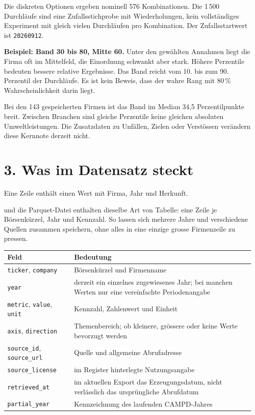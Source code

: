 \documentclass[11pt,a4paper]{article}
\newcommand{\pf}[1]{\path{#1}}
\newcommand{\lead}[1]{{\large\sffamily\color{accent}#1}\par}
\newcommand{\page}[2]{\clearpage\section*{#1}\lead{#2}}
\begin{document}
Die diskreten Optionen ergeben nominell 576 Kombinationen. Die 1\,500 Durchläufe sind eine Zufallsstichprobe mit Wiederholungen, kein vollständiges Experiment mit gleich vielen Durchläufen pro Kombination. Der Zufallsstartwert ist \texttt{20260912}.

\textbf{Beispiel: Band 30 bis 80, Mitte 60.} Unter den gewählten Annahmen liegt die Firma oft im Mittelfeld, die Einordnung schwankt aber stark. Höhere Perzentile bedeuten bessere relative Ergebnisse. Das Band reicht vom 10. bis zum 90. Perzentil der Durchläufe. Es ist kein Beweis, dass der wahre Rang mit 80\,\% Wahrscheinlichkeit darin liegt.

Bei den 143 gespeicherten Firmen ist das Band im Median 34,5 Perzentilpunkte breit. Zwischen Branchen sind gleiche Perzentile keine gleichen absoluten Umweltleistungen. Die Zusatzdaten zu Unfällen, Zielen oder Verstössen verändern diese Kernnote derzeit nicht.

\page{3. Was im Datensatz steckt}{Eine Zeile enthält einen Wert mit Firma, Jahr und Herkunft.}
\pf{data/out/dataset_long.csv} und die Parquet-Datei enthalten dieselbe Art von Tabelle: eine Zeile je Börsenkürzel, Jahr und Kennzahl. So lassen sich mehrere Jahre und verschiedene Quellen zusammen speichern, ohne alles in eine einzige grosse Firmenzeile zu pressen.

\begin{tabularx}{\linewidth}{@{}p{47mm}Y@{}}\toprule
Feld & Bedeutung\\\midrule
\texttt{ticker}, \texttt{company} & Börsenkürzel und Firmenname\\
\texttt{year} & derzeit ein einzelnes zugewiesenes Jahr; bei manchen Werten nur eine vereinfachte Periodenangabe\\
\texttt{metric}, \texttt{value}, \texttt{unit} & Kennzahl, Zahlenwert und Einheit\\
\texttt{axis}, \texttt{direction} & Themenbereich; ob kleinere, grössere oder keine Werte bevorzugt werden\\
\texttt{source\_id}, \texttt{source\_url} & Quelle und allgemeine Abrufadresse\\
\texttt{source\_license} & im Register hinterlegte Nutzungsangabe\\
\texttt{retrieved\_at} & im aktuellen Export das Erzeugungsdatum, nicht verlässlich das ursprüngliche Abrufdatum\\
\texttt{partial\_year} & Kennzeichnung des laufenden CAMPD-Jahres\\\bottomrule
\end{tabularx}
\end{document}
